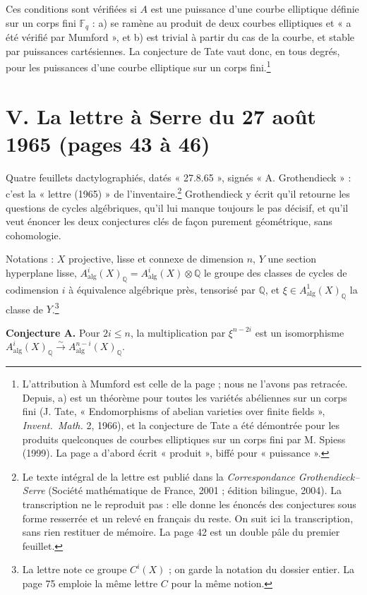 \documentclass[11pt,a4paper]{article}
\begin{document}
Ces conditions sont vérifiées si $A$ est une puissance d'une courbe elliptique
définie sur un corps fini $\mathbb{F}_{q}$ : a) se ramène au produit de deux
courbes elliptiques et « a été vérifié par Mumford », et b) est trivial à partir
du cas de la courbe, et stable par puissances cartésiennes. La conjecture de
Tate vaut donc, en tous degrés, pour les puissances d'une courbe elliptique sur
un corps fini.\footnote{L'attribution à Mumford est celle de la page ; nous
ne l'avons pas retracée. Depuis, a) est un théorème pour toutes les variétés
abéliennes sur un corps fini (J. Tate, « Endomorphisms of abelian varieties over
finite fields », \emph{Invent.\ Math.} 2, 1966), et la conjecture de Tate a été
démontrée pour les produits quelconques de courbes elliptiques sur un corps fini
par M. Spiess (1999). La page a d'abord écrit « produit », biffé pour
« puissance ».}

\section*{V. La lettre à Serre du 27 août 1965 (pages 43 à 46)}

Quatre feuillets dactylographiés, datés « 27.8.65 », signés « A.
Grothendieck » : c'est la « lettre (1965) » de l'inventaire.\footnote{Le texte
intégral de la lettre est publié dans la \emph{Correspondance
Grothendieck--Serre} (Société mathématique de France, 2001 ; édition bilingue,
2004). La transcription ne le reproduit pas : elle donne les énoncés des
conjectures sous forme resserrée et un relevé en français du reste. On suit ici
la transcription, sans rien restituer de mémoire. La page 42 est un double pâle
du premier feuillet.} Grothendieck y écrit qu'il retourne les questions de
cycles algébriques, qu'il lui manque toujours le pas décisif, et qu'il veut
énoncer les deux conjectures clés de façon purement géométrique, sans
cohomologie.

Notations : $X$ projective, lisse et connexe de dimension $n$, $Y$ une section
hyperplane lisse, $A^{i}_{\mathrm{alg}}(X)_{\mathbb{Q}} =
A^{i}_{\mathrm{alg}}(X) \otimes \mathbb{Q}$ le groupe des classes de cycles de
codimension $i$ à équivalence algébrique près, tensorisé par $\mathbb{Q}$, et
$\xi \in A^{1}_{\mathrm{alg}}(X)_{\mathbb{Q}}$ la classe de $Y$.\footnote{La
lettre note ce groupe $C^{i}(X)$ ; on garde la notation du dossier entier. La
page 75 emploie la même lettre $C$ pour la même notion.}

\textbf{Conjecture A.} Pour $2i \leqslant n$, la multiplication par
$\xi^{n-2i}$ est un isomorphisme $A^{i}_{\mathrm{alg}}(X)_{\mathbb{Q}}
\xrightarrow{\sim} A^{n-i}_{\mathrm{alg}}(X)_{\mathbb{Q}}$.
\end{document}
